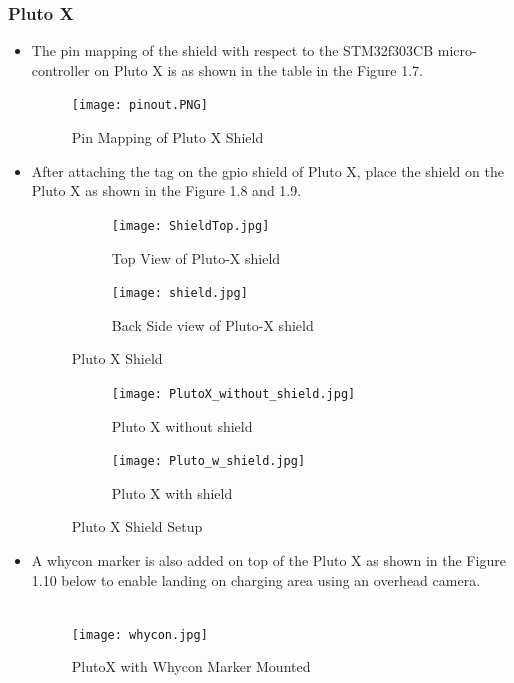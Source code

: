 \documentclass[a4paper,12pt,oneside]{book}
\begin{document}
\subsubsection*{Pluto X}
\begin{itemize}
  \item The pin mapping of the shield with respect to the STM32f303CB micro-controller on Pluto X is as shown in the table in the Figure 1.7. 
  \begin{figure}[H]
  \texttt{[image: pinout.PNG]}
  \caption{Pin Mapping of Pluto X Shield }
  \end{figure}
  \item After attaching the tag on the gpio shield of Pluto X, place the shield on the Pluto X as shown in the Figure 1.8 and 1.9.
  
  \begin{figure}[H]
\centering
\begin{subfigure}{.48\textwidth}
  \centering
  \texttt{[image: ShieldTop.jpg]}
  \caption{Top View of Pluto-X shield}
  \label{fig:sub1}
\end{subfigure}%
\begin{subfigure}{.5\textwidth}
  \centering
  \texttt{[image: shield.jpg]}
  \caption{Back Side view of Pluto-X shield}
  \label{fig:sub2}
\end{subfigure}
\caption{Pluto X Shield}
\label{fig:test}
\end{figure}
  
  \begin{figure}[H]
\centering
\begin{subfigure}{.6\textwidth}
  \centering
  \texttt{[image: PlutoX\_without\_shield.jpg]}
  \caption{Pluto X without shield}
  \label{fig:sub1}
\end{subfigure}%
\begin{subfigure}{.5\textwidth}
  \centering
  \texttt{[image: Pluto\_w\_shield.jpg]}
  \caption{Pluto X with shield}
  \label{fig:sub2}
\end{subfigure}
\caption{Pluto X Shield Setup}
\label{fig:test}
\end{figure}
   
\item A whycon marker is also added on top of the Pluto X as shown in the Figure 1.10 below to enable landing on charging area using an overhead camera. \\ \\
\begin{figure}[H]
\centering
\texttt{[image: whycon.jpg]}
\caption{PlutoX with Whycon Marker Mounted}
\end{figure}
\end{itemize}
\end{document}
